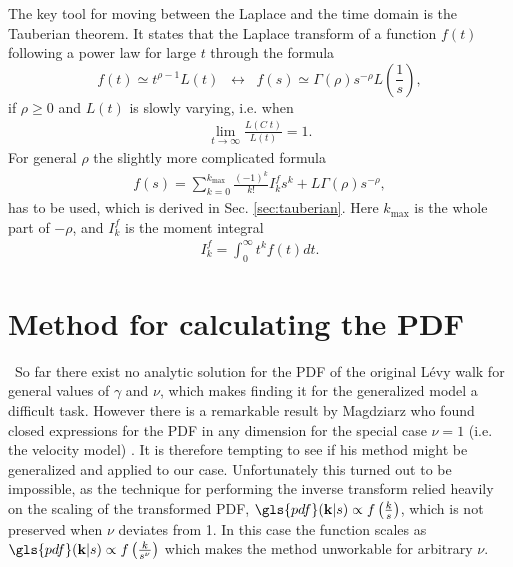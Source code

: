 The key tool for moving between the Laplace and the time domain is the Tauberian theorem. It states that the Laplace transform of a function $f(t)$ following a power law for large $t$ through the formula \cite{firstSteps}
% 
{\color{red}
\begin{equation}
 f(t) \simeq t^{\rho-1} L(t) \;\; \leftrightarrow \;\; f(s) \simeq \Gamma(\rho) s^{-\rho} L\left(\frac{1}{s}\right) \label{eqn:tauberian} ,
\end{equation}
}
%
if $\rho \geq 0 $ and $L(t)$ is slowly varying, i.e. when
%
\begin{align}
\lim_{t \to \infty} \frac{L(C \; t)}{L(t)} = 1 .
\end{align}
%
For general $\rho$ the slightly more complicated formula 
%
\begin{align}
 f(s) = \sum_{k=0}^{k_{\max}} \frac{(-1)^k}{k!} I^{f}_k s^k + L \Gamma(\rho) s^{-\rho} ,
 \label{eqn:generalTauberian}
\end{align}
%
has to be used, which is derived in Sec. \ref{sec:tauberian}. Here $k_{\max}$ is the whole part of $-\rho$, and $I^{f}_k$ is the moment integral
%
\begin{align}
I^{f}_k = \int_0^\infty t^k f(t) dt.
\end{align}



\section{Method for calculating the PDF}

{\color{blue} \
So far there exist no analytic solution for the \gls{PDF} of the original L\'evy walk for general values of $\gamma$ and $\nu$, which makes finding it for the generalized model a difficult task.
} 
However there is a remarkable result by Magdziarz who found closed expressions for the \gls{PDF} in any dimension for the special case $\nu=1$ (i.e. the velocity model) \cite{magdziarz2015, magdziarz2016}. It is therefore tempting to see if his method might be generalized and applied to our case. Unfortunately this turned out to be impossible, as the technique for performing the inverse transform relied heavily on the scaling of the transformed \gls{PDF}, $\gls{pdf}(\ve{k}|s) \propto f\left( \frac{k}{s} \right)$, which is not preserved when $\nu$ deviates from 1. In this case the function scales as $\gls{pdf}(\ve{k}|s) \propto f\left(\frac{k}{s^{\nu}} \right)$ which makes the method unworkable for arbitrary $\nu$.

